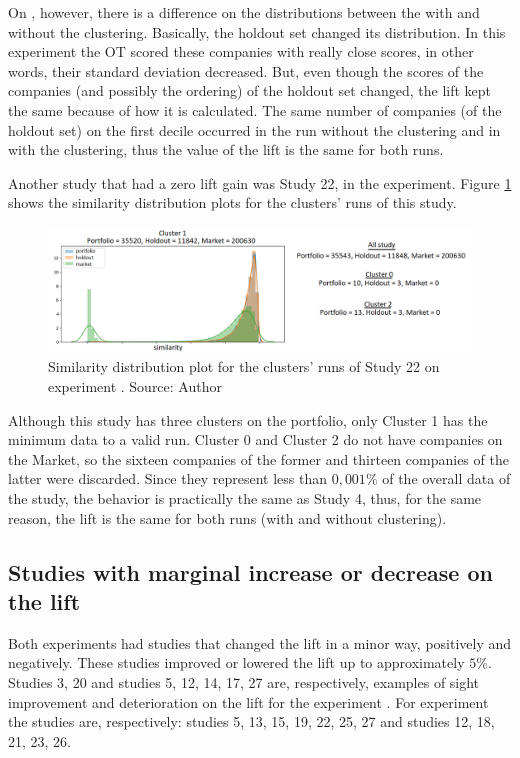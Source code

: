 On \nameExperimentII{}, however, there is a difference on the distributions between the with and without the clustering. Basically, the holdout set changed its distribution. In this experiment the OT scored these companies with really close scores, in other words, their standard deviation decreased. But, even though the scores of the companies (and possibly the ordering) of the holdout set changed, the lift kept the same because of how it is calculated. The same number of companies (of the holdout set) on the first decile occurred in the run without the clustering and in with the clustering, thus the value of the lift is the same for both runs.

Another study that had a zero lift gain was Study 22, in the \nameExperimentI{} experiment. Figure \ref{fig:study-22-clusters-simi-plot} shows the similarity distribution plots for the clusters' runs of this study.

\begin{figure}[h]
   \centering
   \includegraphics[width=\linewidth]{fig/ch4-study-22-clusters-simi-plot.png}
   \caption{Similarity distribution plot for the clusters' runs of Study 22 on experiment \nameExperimentI{}. Source: Author}
   \label{fig:study-22-clusters-simi-plot}
\end{figure}

Although this study has three clusters on the portfolio, only Cluster 1 has the minimum data to a valid run. Cluster 0 and Cluster 2 do not have companies on the Market, so the sixteen companies of the former and thirteen companies of the latter were discarded. Since they represent less than $0,001\%$ of the overall data of the study, the behavior is practically the same as Study 4, thus, for the same reason, the lift is the same for both runs (with and without clustering).

\subsection{Studies with marginal increase or decrease on the lift}
\label{ch:marginal-change}

Both experiments had studies that changed the lift in a minor way, positively and negatively. These studies improved or lowered the lift up to approximately $5\%$. Studies 3, 20 and studies 5, 12, 14, 17, 27 are, respectively, examples of sight improvement and deterioration on the lift for the experiment \nameExperimentI{}. For experiment \nameExperimentII{} the studies are, respectively: studies 5, 13, 15, 19, 22, 25, 27 and studies 12, 18, 21, 23, 26.

